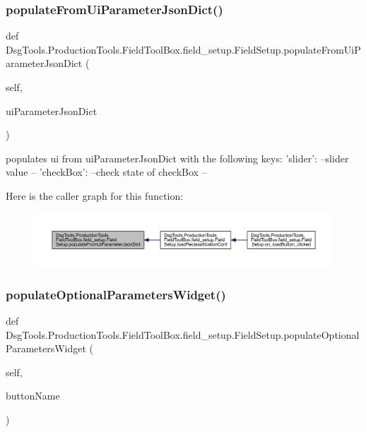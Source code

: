 \subsubsection{\texorpdfstring{populate\+From\+Ui\+Parameter\+Json\+Dict()}{populateFromUiParameterJsonDict()}}
{\footnotesize\ttfamily def Dsg\+Tools.\+Production\+Tools.\+Field\+Tool\+Box.\+field\+\_\+setup.\+Field\+Setup.\+populate\+From\+Ui\+Parameter\+Json\+Dict (\begin{DoxyParamCaption}\item[{}]{self,  }\item[{}]{ui\+Parameter\+Json\+Dict }\end{DoxyParamCaption})}

\begin{DoxyVerb}populates ui from  uiParameterJsonDict with the following keys:
{
    'slider': --slider value --
    'checkBox': --check state of checkBox --
}
\end{DoxyVerb}
 Here is the caller graph for this function\+:
\nopagebreak
\begin{figure}[H]
\begin{center}
\leavevmode
\includegraphics[width=350pt]{class_dsg_tools_1_1_production_tools_1_1_field_tool_box_1_1field__setup_1_1_field_setup_a57af62e03b1d40b564674204a34285d7_icgraph}
\end{center}
\end{figure}
\mbox{\label{class_dsg_tools_1_1_production_tools_1_1_field_tool_box_1_1field__setup_1_1_field_setup_a984912158747ae34893247521efdbbe1}} 
\subsubsection{\texorpdfstring{populate\+Optional\+Parameters\+Widget()}{populateOptionalParametersWidget()}}
{\footnotesize\ttfamily def Dsg\+Tools.\+Production\+Tools.\+Field\+Tool\+Box.\+field\+\_\+setup.\+Field\+Setup.\+populate\+Optional\+Parameters\+Widget (\begin{DoxyParamCaption}\item[{}]{self,  }\item[{}]{button\+Name }\end{DoxyParamCaption})}

